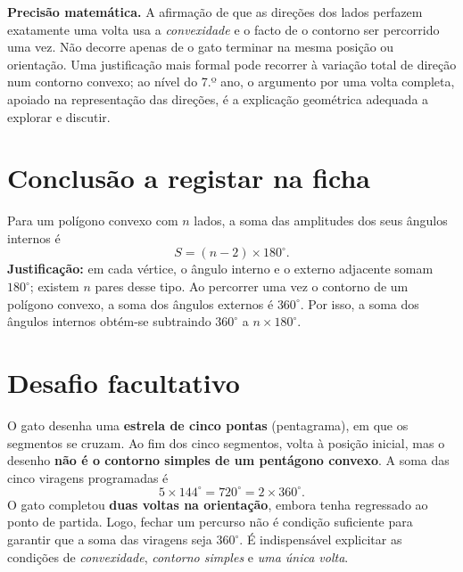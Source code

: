 \begin{nota}
\textbf{Precisão matemática.} A afirmação de que as direções dos
lados perfazem exatamente uma volta usa a \emph{convexidade} e o
facto de o contorno ser percorrido uma vez. Não decorre apenas de o
gato terminar na mesma posição ou orientação. Uma justificação
mais formal pode recorrer à variação total de direção num contorno
convexo; ao nível do 7.º ano, o argumento por uma volta completa,
apoiado na representação das direções, é a explicação geométrica
adequada a explorar e discutir.
\end{nota}

\section*{Conclusão a registar na ficha}

\begin{conclusao}
Para um polígono convexo com $n$ lados, a soma das amplitudes dos
seus ângulos internos é
\[
\boxed{S=(n-2)\times180^\circ}.
\]
\textbf{Justificação:} em cada vértice, o ângulo interno e o externo
adjacente somam $180^\circ$; existem $n$ pares desse tipo. Ao
percorrer uma vez o contorno de um polígono convexo, a soma dos
ângulos externos é $360^\circ$. Por isso, a soma dos ângulos
internos obtém-se subtraindo $360^\circ$ a $n\times180^\circ$.
\end{conclusao}

\section*{Desafio facultativo}

O gato desenha uma \textbf{estrela de cinco pontas} (pentagrama),
em que os segmentos se cruzam. Ao fim dos cinco segmentos, volta
à posição inicial, mas o desenho \textbf{não é o contorno simples
de um pentágono convexo}. A soma das cinco viragens programadas é
\[
5\times144^\circ=\boxed{720^\circ}=2\times360^\circ.
\]
O gato completou \textbf{duas voltas na orientação}, embora tenha
regressado ao ponto de partida. Logo, fechar um percurso não é
condição suficiente para garantir que a soma das viragens seja
$360^\circ$. É indispensável explicitar as condições de
\emph{convexidade}, \emph{contorno simples} e \emph{uma única volta}.

\begin{center}
\end{center}

